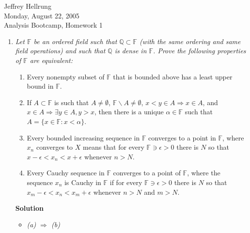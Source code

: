 \documentclass{article}
\begin{document}
\begin{flushright}
Jeffrey Hellrung \\
Monday, August 22, 2005 \\
Analysis Bootcamp, Homework 1 \\
\end{flushright}


\begin{enumerate}

\item {\em Let \(\mathbb{F}\) be an ordered field such that \(\mathbb{Q} \subset \mathbb{F}\) (with the same ordering and same field operations) and such that \(\mathbb{Q}\) is dense in \(\mathbb{F}\).  Prove the following properties of \(\mathbb{F}\) are equivalent:
\begin{enumerate}
\item Every nonempty subset of \(\mathbb{F}\) that is bounded above has a least upper bound in \(\mathbb{F}\).
\item If \(A \subset \mathbb{F}\) is such that \(A \neq \emptyset\), \(\mathbb{F} \backslash A \neq \emptyset\), \(x < y \in A \Rightarrow x \in A\), and \(x \in A \Rightarrow \exists y \in A, y > x\), then there is a unique \(\alpha \in \mathbb{F}\) such that \(A = \{x \in \mathbb{F} : x < \alpha\}\).
\item Every bounded increasing sequence in \(\mathbb{F}\) converges to a point in \(\mathbb{F}\), where \(x_n\) converges to \(X\) means that for every \(\mathbb{F} \ni \epsilon > 0\) there is \(N\) so that \(x - \epsilon < x_n < x + \epsilon\) whenever \(n > N\).
\item Every Cauchy sequence in \(\mathbb{F}\) converges to a point of \(\mathbb{F}\), where the sequence \(x_n\) is Cauchy in \(\mathbb{F}\) if for every \(\mathbb{F} \ni \epsilon > 0\) there is \(N\) so that \(x_m - \epsilon < x_n < x_m + \epsilon\) whenever \(n > N\) and \(m > N\).
\end{enumerate}}

{\bf Solution}
\begin{itemize}
\item {\em (a) \(\Rightarrow\) (b)}


\end{itemize}
\end{enumerate}
\end{document}
